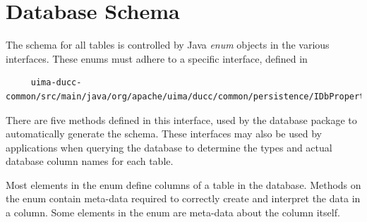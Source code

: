 \section{Database Schema}
    The schema for all tables is controlled by Java {\em enum} objects in the various interfaces.  These enums must adhere to a specific
    interface, defined in
\begin{verbatim}
     uima-ducc-common/src/main/java/org/apache/uima/ducc/common/persistence/IDbProperty.java
\end{verbatim}

     There are five methods defined in this interface, used by the database package to automatically generate
     the schema.  These interfaces may also be used by applications when querying the database to determine
     the types and actual database column names for each table.

     Most elements in the enum define columns of a table in the database.  Methods on the enum
     contain meta-data required to correctly create and interpret the data in a column.  Some elements in the
     enum are meta-data about the column itself.

